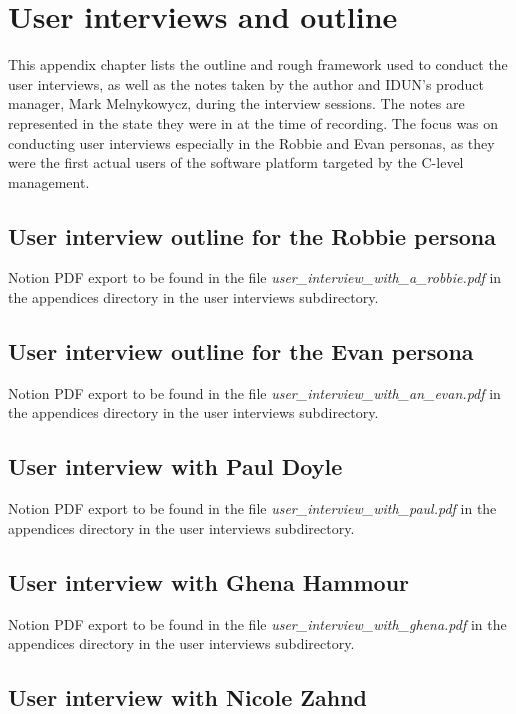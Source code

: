 \chapter{User interviews and outline}
\label{appendix3-user-interviews-and-outline}

This appendix chapter lists the outline and rough framework used to conduct the user interviews, as well as the notes taken by the author and IDUN’s product manager, Mark Melnykowycz, during the interview sessions. The notes are represented in the state they were in at the time of recording. The focus was on conducting user interviews especially in the Robbie and Evan personas, as they were the first actual users of the software platform targeted by the C-level management.

\section*{User interview outline for the Robbie persona}

Notion PDF export to be found in the file \textit{user\_interview\_with\_a\_robbie.pdf} in the appendices directory in the user interviews subdirectory.

\section*{User interview outline for the Evan persona}

Notion PDF export to be found in the file \textit{user\_interview\_with\_an\_evan.pdf} in the appendices directory in the user interviews subdirectory.

\section*{User interview with Paul Doyle}

Notion PDF export to be found in the file \textit{user\_interview\_with\_paul.pdf} in the appendices directory in the user interviews subdirectory.

\section*{User interview with Ghena Hammour}

Notion PDF export to be found in the file \textit{user\_interview\_with\_ghena.pdf} in the appendices directory in the user interviews subdirectory.

\section*{User interview with Nicole Zahnd}

